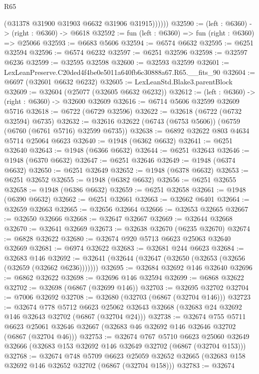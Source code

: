 \begin{lexlean}{R65}
\begin{coremodule}
{              (@31378 @31900 @31903 @6632 @31906 @31915))))))
@32590 := (left : @6360) -> (right : @6360) -> @6618
@32592 := fun (left : @6360) => fun (right : @6360) => @25066
@32593 := @6683 @5606
@32594 := @6574 @6632
@32595 := @6251 @32594
@32596 := @6574 @6232
@32597 := @6251 @32596
@32598 := @32597 @6236
@32599 := @32595 @32598
@32600 := @32593 @32599
@32601 := LexLeanPreserve.C20ded4f4be0e5011a640fb6c30888a67.R65.__fits_90
@32604 := @6697 (@32601 @6632 @6232)
@32605 := LexLeanStd.Blake3.parentBlock
@32609 := @32604 (@25077 (@32605 @6632 @6232))
@32612 := (left : @6360) -> (right : @6360) -> @32600 @32609
@32616 := @6714 @5606 @32599 @32609 @5716
@32618 := @6722 (@6729 @32596)
@32622 := @32618 (@6722 (@6732 @32594) @6735)
@32632 := @32616 @32622 (@6743 (@6753 @5606)) (@6759 (@6760 (@6761 @5716) @32599 @6735))
@32638 := @6892 @32622 @803 @4634 @5714 @25064 @6623
@32640 := @1948 (@6362 @6632)
@32641 := @6251 @32640
@32643 := @1948 (@6366 @6632)
@32644 := @6251 @32643
@32646 := @1948 (@6370 @6632)
@32647 := @6251 @32646
@32649 := @1948 (@6374 @6632)
@32650 := @6251 @32649
@32652 := @1948 (@6378 @6632)
@32653 := @6251 @32652
@32655 := @1948 (@6382 @6632)
@32656 := @6251 @32655
@32658 := @1948 (@6386 @6632)
@32659 := @6251 @32658
@32661 := @1948 (@6390 @6632)
@32662 := @6251 @32661
@32663 := @32662 @6401
@32664 := @32659 @32663
@32665 := @32656 @32664
@32666 := @32653 @32665
@32667 := @32650 @32666
@32668 := @32647 @32667
@32669 := @32644 @32668
@32670 := @32641 @32669
@32673 := @32638 @32670 (@6235 @32670)
@32674 := @6828 @32622
@32680 := @32674 @920 @5713 @6623 @25063 @32640 @32669
@32681 := @6974 @32622
@32683 := @32681 @244 @6623
@32684 := @32683 @146
@32692 := @32641 (@32644 (@32647 (@32650 (@32653 (@32656 (@32659 (@32662 @6236)))))))
@32695 := @32684 @32692 @146 @32640
@32696 := @6862 @32622
@32698 := @32696 @146 @32594
@32699 := @6868 @32622
@32702 := @32698 (@6867 (@32699 @146))
@32703 := @32695 @32702
@32704 := @7006 @32692
@32708 := @32680 (@32703 (@6867 (@32704 @146)))
@32723 := @32674
    @778
    @5712
    @6623
    @25062
    @32643
    @32668
    (@32683 @24 @32692 @146 @32643 @32702 (@6867 (@32704 @24)))
@32738 := @32674
    @755
    @5711
    @6623
    @25061
    @32646
    @32667
    (@32683 @46 @32692 @146 @32646 @32702 (@6867 (@32704 @46)))
@32753 := @32674
    @767
    @5710
    @6623
    @25060
    @32649
    @32666
    (@32683 @153 @32692 @146 @32649 @32702 (@6867 (@32704 @153)))
@32768 := @32674
    @748
    @5709
    @6623
    @25059
    @32652
    @32665
    (@32683 @158 @32692 @146 @32652 @32702 (@6867 (@32704 @158)))
@32783 := @32674
}
\end{coremodule}
\end{lexlean}
